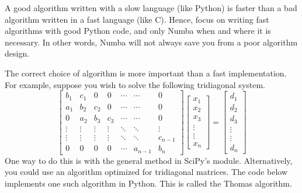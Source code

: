 A good algorithm written with a slow language (like Python) is faster than a bad algorithm written in a fast language (like C).
Hence, focus on writing fast algorithms with good Python code, and only Numba when and where it is necessary. In other words, Numba will not always save you from a poor algorithm design.


\begin{comment}
\begin{problem}
Optimize the following function using techniques described in this lab:
\begin{lstlisting}
# TODO: COME UP WITH SOME ALGORITHM TO DO HERE!!
\end{lstlisting}
It should also include a list of changes, the reasoning behind the changes, and the effect of the changes on runtime. On the author's computer, computing the LU-decomposition on a 1000x1000 matrix took over 2 and a half minutes. The optimized version took a little over a second.

Hint: The best way to approach this problem is to analyze what each piece of code is actually doing. Then, determine if there is a more efficient way to accomplish the same task. Specifically, look for ways to use array operations instead of for loops, ways to replace blocks of code with built-in Python functions, and ways to avoid recomputing values.
\end{problem}
\end{comment}

The correct choice of algorithm is more important than a fast implementation.
For example, suppose you wish to solve the following tridiagonal system.
\[\begin{bmatrix}
b_1 & c_1 & 0 & 0 & \cdots & \cdots & 0 \\
a_1 & b_2 & c_2 & 0 & \cdots & \cdots & 0 \\
0 & a_2 & b_3 & c_3 & \cdots & \cdots & 0 \\
\vdots & \vdots & \vdots & \vdots & \ddots & \ddots & \vdots \\
\vdots & \vdots & \vdots & \vdots & \ddots & \ddots & c_{n-1} \\
0 & 0 & 0 & 0 & \cdots & a_{n-1} & b_n
\end{bmatrix}
\begin{bmatrix}
x_1\\
x_2\\
x_3\\
\vdots\\
\vdots\\
x_n
\end{bmatrix}
=
\begin{bmatrix}
d_1\\
d_2\\
d_3\\
\vdots\\
\vdots\\
d_n
\end{bmatrix}\]
One way to do this is with the general  method in SciPy's  module.
Alternatively, you could use an algorithm optimized for tridiagonal matrices.
The code below implements one such algorithm in Python. This is called the Thomas algorithm.

